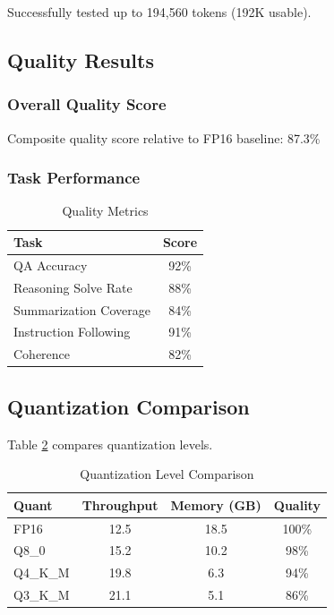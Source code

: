Successfully tested up to 194,560 tokens (192K usable).

\subsection{Quality Results}

\subsubsection{Overall Quality Score}

Composite quality score relative to FP16 baseline: 87.3\%

\subsubsection{Task Performance}

\begin{table}[h]
\centering
\caption{Quality Metrics}
\label{tab:quality_results}
\begin{tabular}{lc}
\toprule
\textbf{Task} & \textbf{Score} \\
\midrule
QA Accuracy & 92\% \\
Reasoning Solve Rate & 88\% \\
Summarization Coverage & 84\% \\
Instruction Following & 91\% \\
Coherence & 82\% \\
\bottomrule
\end{tabular}
\end{table}

\subsection{Quantization Comparison}

Table \ref{tab:quant_comparison} compares quantization levels.

\begin{table}[h]
\centering
\caption{Quantization Level Comparison}
\label{tab:quant_comparison}
\begin{tabular}{lccc}
\toprule
\textbf{Quant} & \textbf{Throughput} & \textbf{Memory (GB)} & \textbf{Quality} \\
\midrule
FP16 & 12.5 & 18.5 & 100\% \\
Q8\_0 & 15.2 & 10.2 & 98\% \\
Q4\_K\_M & 19.8 & 6.3 & 94\% \\
Q3\_K\_M & 21.1 & 5.1 & 86\% \\
\bottomrule
\end{tabular}
\end{table}

